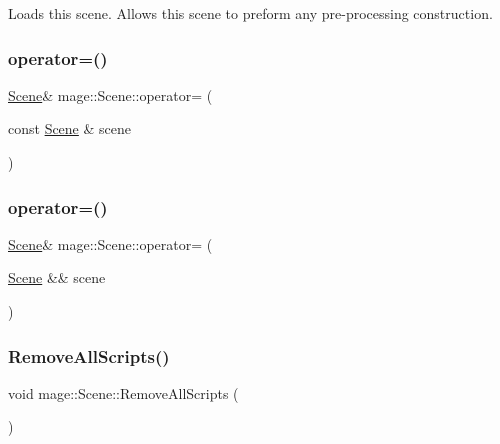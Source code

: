 Loads this scene. Allows this scene to preform any pre-\/processing construction. \hypertarget{classmage_1_1_scene_a2c25c0fedc0230771d8c00a8288a69ce}{}\label{classmage_1_1_scene_a2c25c0fedc0230771d8c00a8288a69ce} 
\subsubsection{\texorpdfstring{operator=()}{operator=()}\hspace{0.1cm}{\footnotesize\ttfamily [1/2]}}
{\footnotesize\ttfamily \hyperlink{classmage_1_1_scene}{Scene}\& mage\+::\+Scene\+::operator= (\begin{DoxyParamCaption}\item[{const \hyperlink{classmage_1_1_scene}{Scene} \&}]{scene }\end{DoxyParamCaption})\hspace{0.3cm}{\ttfamily [delete]}}

\hypertarget{classmage_1_1_scene_a400926762670c9cd9b6d456291600f53}{}\label{classmage_1_1_scene_a400926762670c9cd9b6d456291600f53} 
\subsubsection{\texorpdfstring{operator=()}{operator=()}\hspace{0.1cm}{\footnotesize\ttfamily [2/2]}}
{\footnotesize\ttfamily \hyperlink{classmage_1_1_scene}{Scene}\& mage\+::\+Scene\+::operator= (\begin{DoxyParamCaption}\item[{\hyperlink{classmage_1_1_scene}{Scene} \&\&}]{scene }\end{DoxyParamCaption})\hspace{0.3cm}{\ttfamily [delete]}}

\hypertarget{classmage_1_1_scene_a04b6e0b4d9ca18d15d3da098e581d336}{}\label{classmage_1_1_scene_a04b6e0b4d9ca18d15d3da098e581d336} 
\subsubsection{\texorpdfstring{Remove\+All\+Scripts()}{RemoveAllScripts()}}
{\footnotesize\ttfamily void mage\+::\+Scene\+::\+Remove\+All\+Scripts (\begin{DoxyParamCaption}{ }\end{DoxyParamCaption})}

